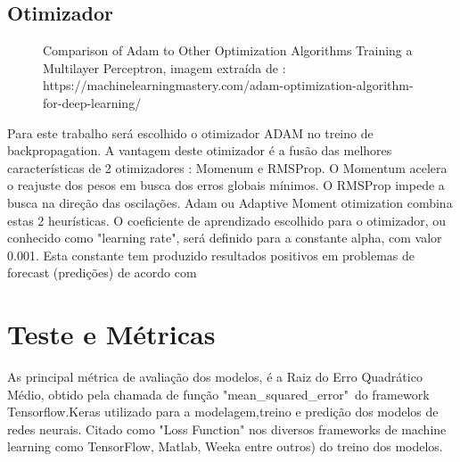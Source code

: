 \documentclass[	12pt, Times, openright, twoside, a4paper, english, brazil]{abntex2}
\begin{document}
    \subsection{Otimizador}
        \begin{figure}[!ht]
        	\caption{Comparison of Adam to Other Optimization Algorithms Training a Multilayer Perceptron, imagem extraída de : \cite{MLM} https://machinelearningmastery.com/adam-optimization-algorithm-for-deep-learning/ \label{fig:otimizadores}}
        \end{figure}
        Para este trabalho será escolhido o otimizador ADAM no treino de backpropagation.
        A vantagem deste otimizador é a fusão das melhores características de 2 otimizadores :\newline 
         Momenum e RMSProp. \newline
        O Momentum acelera o reajuste dos pesos em busca dos erros globais mínimos.\newline
         O RMSProp impede a busca na direção das oscilações.\newline
         Adam ou Adaptive Moment otimization combina estas 2 heurísticas.
        O coeficiente de aprendizado escolhido para o otimizador, ou conhecido como "learning rate", será definido para a constante alpha, com valor 0.001.
        Esta constante tem produzido resultados positivos em problemas de forecast (predições) de acordo com \cite{MLM}

    \section{Teste e Métricas}
       As principal métrica de avaliação dos modelos, é a Raiz do Erro Quadrático Médio, obtido pela chamada de função "mean\_squared\_error"\ do framework Tensorflow.Keras utilizado para a modelagem,treino e predição dos modelos de redes neurais. Citado como "Loss Function" nos diversos frameworks de machine learning como TensorFlow, Matlab, Weeka entre outros) do treino dos modelos.\newline
       
\end{document}
